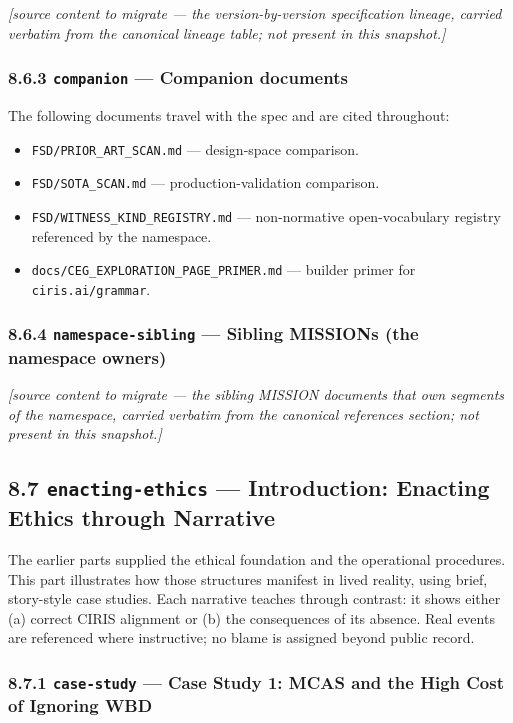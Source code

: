 \documentclass[11pt]{article}
\begin{document}
\textit{[source content to migrate — the version-by-version specification lineage, carried verbatim from the canonical lineage table; not present in this snapshot.]}


\subsubsection*{8.6.3 \texttt{companion} — Companion documents}


The following documents travel with the spec and are cited throughout:


\begin{itemize}\setlength\itemsep{0pt}
\item \texttt{FSD/PRIOR\_ART\_SCAN.md} — design-space comparison.
\item \texttt{FSD/SOTA\_SCAN.md} — production-validation comparison.
\item \texttt{FSD/WITNESS\_KIND\_REGISTRY.md} — non-normative open-vocabulary registry referenced by the namespace.
\item \texttt{docs/CEG\_EXPLORATION\_PAGE\_PRIMER.md} — builder primer for \texttt{ciris.ai/grammar}.
\end{itemize}


\subsubsection*{8.6.4 \texttt{namespace-sibling} — Sibling MISSIONs (the namespace owners)}


\textit{[source content to migrate — the sibling MISSION documents that own segments of the namespace, carried verbatim from the canonical references section; not present in this snapshot.]}


\subsection*{8.7 \texttt{enacting-ethics} — Introduction: Enacting Ethics through Narrative}


The earlier parts supplied the ethical foundation and the operational procedures. This part illustrates how those structures manifest in lived reality, using brief, story-style case studies. Each narrative teaches through contrast: it shows either (a) correct CIRIS alignment or (b) the consequences of its absence. Real events are referenced where instructive; no blame is assigned beyond public record.


\subsubsection*{8.7.1 \texttt{case-study} — Case Study 1: MCAS and the High Cost of Ignoring WBD}
\end{document}
